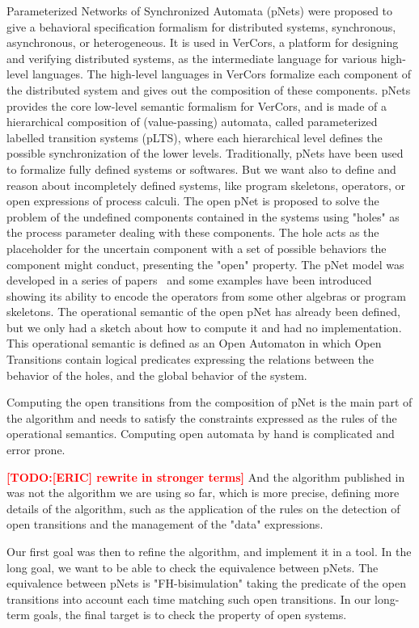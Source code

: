 \documentclass{lncs/llncs}
\newcommand{\TODO}[1]{\textcolor{red}{\textbf{[TODO:#1]}}}
\newcommand{\QIN}[1]{\textcolor{airforceblue}{#1}}
\begin{document}
Parameterized Networks of Synchronized Automata (pNets) were proposed
to give a behavioral specification formalism for distributed
systems, synchronous, asynchronous, or heterogeneous. It is used in
VerCors, a platform for designing and 
verifying distributed systems, as the intermediate language for various
high-level languages. The high-level languages in VerCors formalize
each component of the 
distributed system and gives out the composition of these
components.
pNets provides the core low-level semantic formalism for VerCors, and
is made of a hierarchical composition of (value-passing) automata,
called parameterized labelled transition systems (pLTS), where each
hierarchical level defines the possible synchronization of the lower levels.
Traditionally, pNets have been used to formalize fully
defined systems or softwares. But we want also to define and reason
about incompletely defined systems, like program skeletons, operators,
or open expressions of process calculi.
The open pNet is proposed to solve the
problem of the undefined components contained in the systems using
"holes" as the process parameter dealing with these components. The
hole acts as the placeholder for the uncertain component with a set of
possible behaviors the component might conduct, presenting the "open"
property.  
The pNet model was developed in a series of
papers~\cite{HMZ:PDP15,henrio:Forte2016} and some examples have been
introduced showing its ability to encode the operators from some
other algebras or  program skeletons. The operational semantic of the open pNet has
already been defined, but we only had a sketch about how to compute it and
had no implementation. This operational semantic is defined as an
Open Automaton in which Open Transitions contain logical predicates
expressing the relations between the behavior of the holes, and the
global behavior of the system.

Computing the open transitions from the composition of pNet is the
main part of the algorithm and needs to satisfy the constraints expressed as
the rules of the operational semantics.
Computing open automata by hand is complicated and error prone. 

\TODO{[ERIC] rewrite in stronger terms}
\QIN{
And the algorithm published in \cite{henrio:Forte2016} was not the algorithm we are using
so far, which is more precise, defining more details of the algorithm, such as the application of 
the rules on the detection of open transitions and the management of the "data" expressions. 
}

Our first goal was then to refine the
algorithm, and implement it in a tool.
In the long goal, we want to be able to check the equivalence between
pNets. The equivalence between pNets is "FH-bisimulation" taking the
predicate of the open transitions into account each time matching such
open transitions. In our long-term goals, the final target is to check
the property of open systems.
\end{document}
